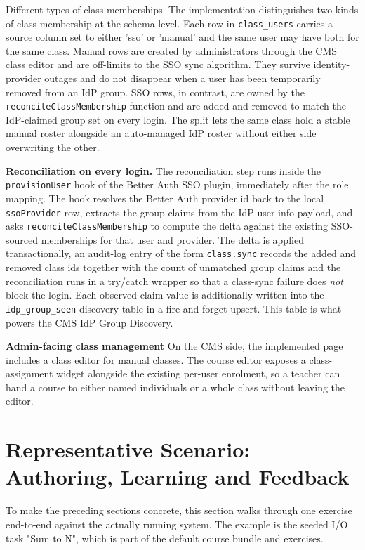 Different types of class memberships. The implementation distinguishes two kinds of class membership at the schema level. 
Each row in \texttt{class\_users} carries a source column set to either 'sso' or 'manual' and the same user may have 
both for the same class. Manual rows are created by administrators through the CMS class editor and are off-limits to the 
SSO sync algorithm. They survive identity-provider outages and do not disappear when a user has been temporarily removed 
from an IdP group.
SSO rows, in contrast, are owned by the \texttt{reconcileClassMembership} function and are added and removed to 
match the IdP-claimed group set on every login.
The split lets the same class hold a stable manual roster alongside an auto-managed IdP roster without either 
side overwriting the other.

\textbf{Reconciliation on every login.} The reconciliation step runs inside the \texttt{provisionUser} hook of the 
Better Auth SSO plugin, immediately after the role mapping.
The hook resolves the Better Auth provider id back to the local \texttt{ssoProvider} row, extracts the group claims 
from the IdP user-info payload, and asks \texttt{reconcileClassMembership} to compute the delta against the 
existing SSO-sourced memberships for that user and provider. The delta is applied transactionally, an audit-log entry of 
the form \texttt{class.sync} records the added and removed class ids together with the count of
unmatched group claims and the reconciliation runs in a try/catch wrapper so that a class-sync failure does 
\textit{not} block the login. Each observed claim value is additionally written into the \texttt{idp\_group\_seen} 
discovery table in a fire-and-forget upsert.
This table is what powers the CMS IdP Group Discovery.

\textbf{Admin-facing class management} On the CMS side, the implemented page includes a class editor for manual classes.
The course editor exposes a class-assignment widget alongside the existing per-user enrolment, so a teacher can
hand a course to either named individuals or a whole class without leaving the editor.


\section{Representative Scenario: Authoring, Learning and Feedback}
\label{sec:example-scenario}
To make the preceding sections concrete, this section walks through one exercise end-to-end against the actually running system.
The example is the seeded I/O task "Sum to N", which is part of the default course bundle and exercises.

